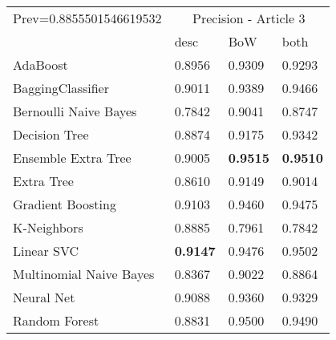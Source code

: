 \begin{tabular}{|l|l|l|l| }
\hline
Prev=0.8855501546619532 &  \multicolumn{3}{c|}{Precision - Article 3} \\
\cline{2-4} & desc & BoW & both \\ \hline
AdaBoost                & 0.8956 & 0.9309 & 0.9293\\
BaggingClassifier       & 0.9011 & 0.9389 & 0.9466\\
Bernoulli Naive Bayes   & 0.7842 & 0.9041 & 0.8747\\
Decision Tree           & 0.8874 & 0.9175 & 0.9342\\
Ensemble Extra Tree     & 0.9005 & {\bf 0.9515} & {\bf 0.9510}\\
Extra Tree              & 0.8610 & 0.9149 & 0.9014\\
Gradient Boosting       & 0.9103 & 0.9460 & 0.9475\\
K-Neighbors             & 0.8885 & 0.7961 & 0.7842\\
Linear SVC              & {\bf 0.9147} & 0.9476 & 0.9502\\
Multinomial Naive Bayes & 0.8367 & 0.9022 & 0.8864\\
Neural Net              & 0.9088 & 0.9360 & 0.9329\\
Random Forest           & 0.8831 & 0.9500 & 0.9490\\
\hline
\end{tabular}